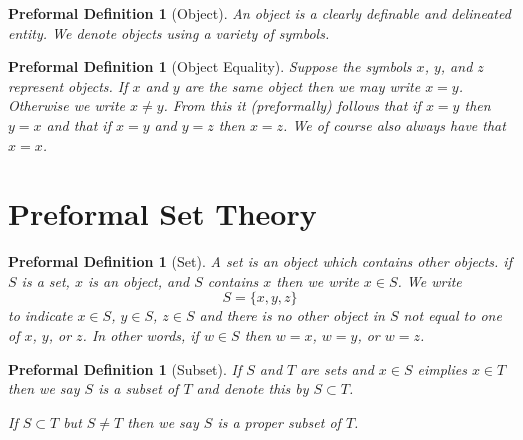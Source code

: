 \documentclass[oneside, 12pt]{book}
\theoremstyle{break}
\newtheorem{preformal definition}[definition]{Preformal Definition}
\newtheorem{preformal theorem}[theorem]{Preformal Theorem}
\begin{document}
			\begin{preformal definition}[Object]
				An object is a clearly definable and delineated entity.
				We denote objects using a variety of symbols.
			\end{preformal definition}
						
			\begin{preformal definition}[Object Equality]
				Suppose the symbols $x$, $y$, and $z$ represent objects.
				If $x$ and $y$ are the same object then we may write $x = y$. Otherwise we write $x\not = y$.
				From this it (preformally) follows that if $x= y$ then $y = x$ and that if $x = y$ and $y = z$ then $x = z$.
				We of course also always have that $x = x$.
			\end{preformal definition}		
		
		\section{Preformal Set Theory}
		
			\begin{preformal definition}[Set]
				A set is an object which contains other objects.
				if $S$ is a set, $x$ is an object, and $S$ contains $x$ then we write $x \in S$.
				We write
				\begin{equation*}
					S = \{x, y, z\}
				\end{equation*}
				to indicate $x\in S$, $y\in S$, $z\in S$ and there is no other object in $S$ not equal to one of $x$, $y$, or $z$.
				In other words, if $w\in S$ then $w=x$, $w=y$, or $w=z$.
			\end{preformal definition}
			
			\begin{preformal definition}[Subset]
				If $S$ and $T$ are sets and $x\in S$ eimplies $x\in T$ then we say $S$ is a subset of $T$ and denote this by $S \subset T$.
				
				If $S\subset T$ but $S \neq T$ then we say $S$ is a proper subset of $T$.
			\end{preformal definition}
			
\end{document}
